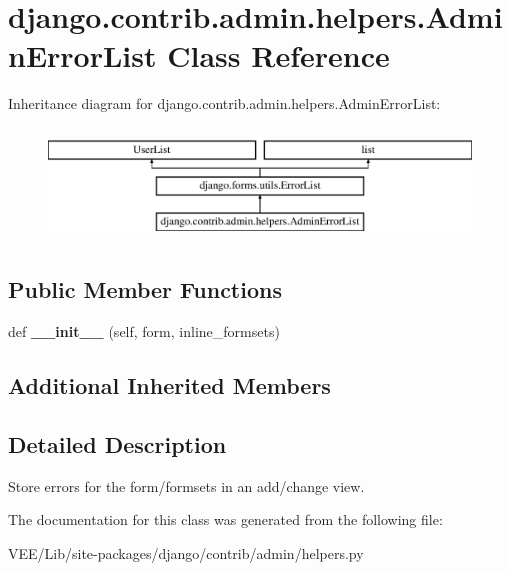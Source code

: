 \hypertarget{classdjango_1_1contrib_1_1admin_1_1helpers_1_1_admin_error_list}{}\section{django.\+contrib.\+admin.\+helpers.\+Admin\+Error\+List Class Reference}
\label{classdjango_1_1contrib_1_1admin_1_1helpers_1_1_admin_error_list}
Inheritance diagram for django.\+contrib.\+admin.\+helpers.\+Admin\+Error\+List\+:\begin{figure}[H]
\begin{center}
\leavevmode
\includegraphics[height=3.000000cm]{classdjango_1_1contrib_1_1admin_1_1helpers_1_1_admin_error_list}
\end{center}
\end{figure}
\subsection*{Public Member Functions}
\begin{DoxyCompactItemize}
\item 
\mbox{\label{classdjango_1_1contrib_1_1admin_1_1helpers_1_1_admin_error_list_adee5f9eab2f4929c7b40ae49fa18e1cd}} 
def {\bfseries \+\_\+\+\_\+init\+\_\+\+\_\+} (self, form, inline\+\_\+formsets)
\end{DoxyCompactItemize}
\subsection*{Additional Inherited Members}


\subsection{Detailed Description}
\begin{DoxyVerb}Store errors for the form/formsets in an add/change view.\end{DoxyVerb}
 

The documentation for this class was generated from the following file\+:\begin{DoxyCompactItemize}
\item 
V\+E\+E/\+Lib/site-\/packages/django/contrib/admin/helpers.\+py\end{DoxyCompactItemize}
